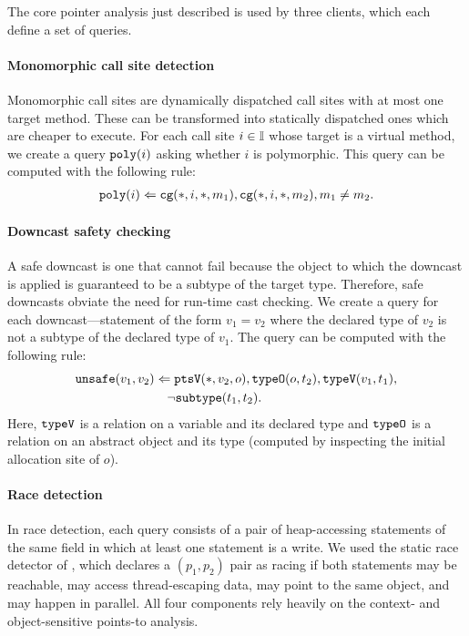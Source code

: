 
The core pointer analysis just described is used by three clients, which each
define a set of queries.

\paragraph{Monomorphic call site detection}

Monomorphic call sites are dynamically dispatched call sites with at most one
target method.  These can be transformed into statically dispatched ones which
are cheaper to execute.
For each call site $i \in {\mathbb I}$ whose target is a virtual method,
we create a query $\text{\tt poly}(i)$ asking whether $i$ is polymorphic.
This query can be computed with the following rule:
\begin{align}
\text{\tt poly}(i) \Leftarrow \text{\tt cg}(*,i,*,m_1), \text{\tt cg}(*,i,*,m_2), m_1 \neq m_2.
\end{align}

\paragraph{Downcast safety checking}

A safe downcast is one that cannot fail because the object to which the
downcast is applied is guaranteed to be a subtype of the target type.
Therefore, safe downcasts obviate the need for run-time cast checking.
We create a query for each downcast---statement of the form $v_1 = v_2$ where the
declared type of $v_2$ is not a subtype of the declared type of $v_1$.
The query can be computed with the following rule:
\begin{align}
& \text{\tt unsafe}(v_1,v_2) \Leftarrow \text{\tt ptsV}(*,v_2,o), \text{\tt typeO}(o,t_2), \text{\tt typeV}(v_1,t_1), \nonumber \\
& \hspace{1in} \neg\text{\tt subtype}(t_1,t_2).
\end{align}
Here, $\text{\tt typeV}$ is a relation on a variable and its declared type
and $\text{\tt typeO}$ is a relation on an abstract object and its type
(computed by inspecting the initial allocation site of $o$).

\paragraph{Race detection}

In race detection, each query consists of a pair of heap-accessing statements
of the same field in which at least one statement is a write.  We used the
static race detector of \cite{NaikAikenWhaley2006}, which declares a
$(p_1,p_2)$ pair as racing if both statements may be reachable, may access
thread-escaping data, may point to the same object, and may happen in parallel.
All four components rely heavily on the context- and object-sensitive points-to
analysis.

